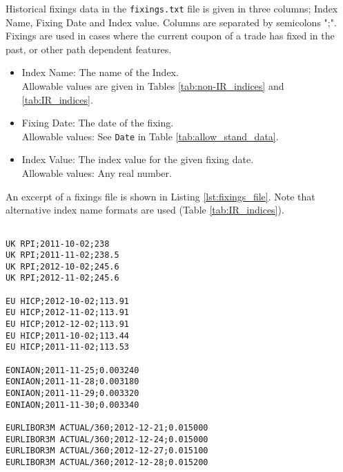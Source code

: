 Historical fixings data in the {\tt fixings.txt} file is given in three columns;  Index Name,  Fixing Date and  Index value. Columns are separated by semicolons ";". Fixings are used in cases where the current coupon of a trade has fixed in the past, or other path dependent features.

\begin{itemize}

\item Index Name: The name of the Index. \\Allowable values are given in Tables \ref{tab:non-IR_indices} and \ref{tab:IR_indices}.

\item Fixing Date: The date of the fixing.  \\ Allowable values:  See \lstinline!Date! in Table \ref{tab:allow_stand_data}.

\item Index Value: The index value for the given fixing date. \\Allowable values: Any real number.
\end{itemize}

An excerpt of a fixings file is shown in Listing \ref{lst:fixings_file}. Note that alternative index name formats are used (Table \ref{tab:IR_indices}).

\begin{lstlisting}[label=lst:fixings_file,caption=Fixings File (fixings.txt)]

UK RPI;2011-10-02;238
UK RPI;2011-11-02;238.5
UK RPI;2012-10-02;245.6
UK RPI;2012-11-02;245.6

EU HICP;2012-10-02;113.91
EU HICP;2012-11-02;113.91
EU HICP;2012-12-02;113.91
EU HICP;2011-10-02;113.44
EU HICP;2011-11-02;113.53

EONIAON;2011-11-25;0.003240
EONIAON;2011-11-28;0.003180
EONIAON;2011-11-29;0.003320
EONIAON;2011-11-30;0.003340

EURLIBOR3M ACTUAL/360;2012-12-21;0.015000
EURLIBOR3M ACTUAL/360;2012-12-24;0.015000
EURLIBOR3M ACTUAL/360;2012-12-27;0.015100
EURLIBOR3M ACTUAL/360;2012-12-28;0.015200

   
\end{lstlisting}

